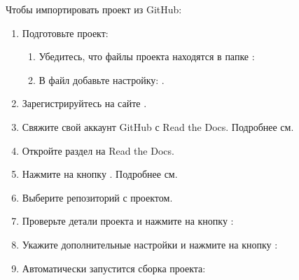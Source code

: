 \documentclass[letterpaper,12pt,russian]{sphinxmanual}
\begin{document}
Чтобы импортировать проект из GitHub:
\begin{enumerate}
%
\item {} 
Подготовьте проект:
\begin{enumerate}
%
\item {} 
Убедитесь, что файлы проекта находятся в папке :


\item {} 
В файл  добавьте настройку: .

\end{enumerate}

\item {} 
Зарегистрируйтесь на сайте .

\item {} 
Свяжите свой аккаунт GitHub с Read the Docs. Подробнее см. 

\item {} 
Откройте раздел  на Read the Docs.


\item {} 
Нажмите на кнопку . Подробнее см. 

\item {} 
Выберите репозиторий с проектом.

\item {} 
Проверьте детали проекта и нажмите на кнопку :


\item {} 
Укажите дополнительные настройки и нажмите на кнопку :


\item {} 
Автоматически запустится сборка проекта:


\end{enumerate}
\end{document}
